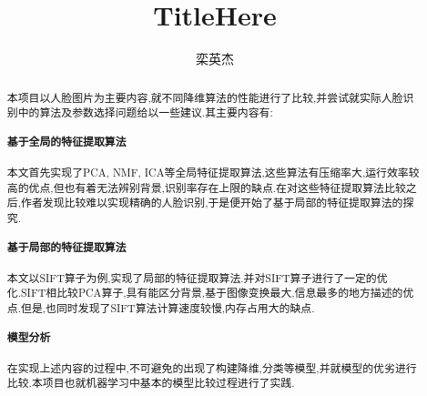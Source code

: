   \confidential{}%
  \title[兰州大学本科毕业设计实践~\LaTeX{}~模板]{TitleHere}
  \author{栾英杰}%
\maketitle
\makeenglishtitle


\begin{abstract}

本项目以人脸图片为主要内容,就不同降维算法的性能进行了比较,并尝试就实际人脸识别中的算法及参数选择问题给以一些建议.其主要内容有:

\paragraph{基于全局的特征提取算法} 本文首先实现了PCA, NMF, ICA等全局特征提取算法,这些算法有压缩率大,运行效率较高的优点,但也有着无法辨别背景,识别率存在上限的缺点.在对这些特征提取算法比较之后,作者发现比较难以实现精确的人脸识别,于是便开始了基于局部的特征提取算法的探究.
\paragraph{基于局部的特征提取算法} 本文以SIFT算子为例,实现了局部的特征提取算法.并对SIFT算子进行了一定的优化.SIFT相比较PCA算子,具有能区分背景,基于图像变换最大,信息最多的地方描述的优点.但是,也同时发现了SIFT算法计算速度较慢,内存占用大的缺点.
\paragraph{模型分析} 在实现上述内容的过程中,不可避免的出现了构建降维,分类等模型,并就模型的优劣进行比较.本项目也就机器学习中基本的模型比较过程进行了实践.



\end{abstract}


